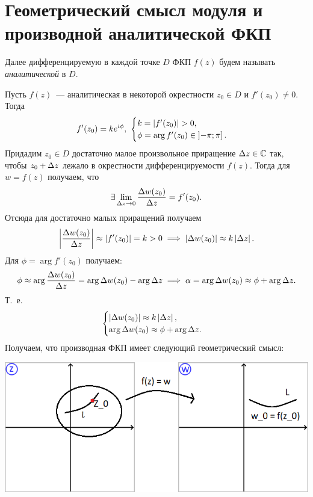 \documentclass[../../main.tex]{subfiles}
\begin{document}
\section{Геометрический смысл модуля и производной аналитической ФКП}

Далее дифференцируемую в каждой точке $ D $ ФКП $ f(z) $
будем называть \emph{аналитической} в $ D $.

Пусть $ f(z) $~--- аналитическая в некоторой окрестности $ z_0 \in D $ и 
$ f'(z_0) \neq 0 $. Тогда
\[
f'(z_0) = k e^{i\phi},\
\begin{cases}
	k = \left|{f'(z_0)}\right| > 0,\\
	\phi = \arg f'(z_0) \in \left]-\pi; \pi\right].
\end{cases}
\]
Придадим $ z_0 \in D $ достаточно малое произвольное приращение 
$ \Delta z \in \mathbb{C} $ так, чтобы $ z_0 + \Delta z $ лежало в 
окрестности
дифференцируемости $ f(z) $. Тогда для $w = f(z)$ получаем, что
\[\exists \lim\limits_{\Delta z \to 0} \dfrac{\Delta w(z_0)}{\Delta z} = f'(z_0).\]
Отсюда для достаточно малых приращений получаем
\[
\left|{\dfrac{\Delta w(z_0)}{\Delta z}}\right| \approx \left|{f'(z_0)}\right| = k > 0
\implies \left|{\Delta w(z_0)}\right| \approx k\left|{\Delta z}\right|.
\]
Для $ \phi = \arg f'(z_0) $ получаем: \[ \phi \approx \arg 
\dfrac{\Delta w(z_0)}{\Delta z} = \arg \Delta w(z_0) - \arg \Delta z \implies
\alpha = \arg \Delta w(z_0) \approx \phi + \arg \Delta z.
\]
Т.~е.
\begin{equation}
\label{lec29:23}
\begin{cases}
	\left|{\Delta w (z_0)}\right| \approx k\left|{\Delta z}\right|,\\
	\arg \Delta w(z_0) \approx \phi + \arg \Delta z.
\end{cases}
\end{equation}
Получаем, что производная ФКП имеет следующий геометрический смысл:

\begin{center}
\includegraphics{lec29_1}
\end{center}
\end{document}
